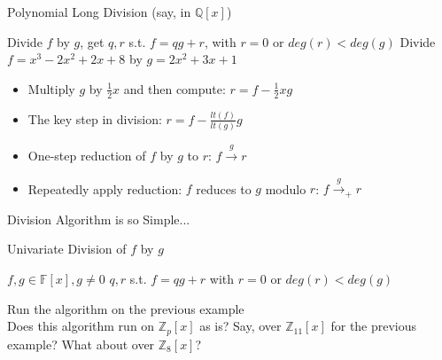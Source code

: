 \documentclass[xcolor=dvipsnames]{beamer}
\newcommand{\Z}{{\mathbb{Z}}}
\newcommand{\Q}{{\mathbb{Q}}}
\newcommand{\F}{{\mathbb{F}}}
\newcommand{\bi}{\begin{itemize}}
\newcommand{\ei}{\end{itemize}}
\begin{document}
\begin{frame}{{\large Polynomial Long Division (say, in $\Q[x]$)}}

Divide $f$ by $g$, get $q, r$ s.t. $f = qg + r$, with $r = 0$ or
$deg(r) < deg(g)$
\pause
Divide $f = x^3-2x^2+2x+8$ by $g =2x^2+3x + 1$\\

\pause


\pause

\bi
\item Multiply $g$ by $\frac{1}{2}x$ and then compute: $r = f - \frac{1}{2}x g$
\item The key step in division: \alert{$r = f - \frac{lt(f)}{lt(g)}
  g$}
\item One-step reduction of $f$ by $g$ to $r$: $f \xrightarrow{g} r$
\item Repeatedly apply reduction: $f$ reduces to $g$ modulo $r$: $f \xrightarrow{g}_+ r$
\ei

\end{frame}

\begin{frame}{{\large Division Algorithm is so Simple...}}

 \begin{algorithm}[H]
 \caption{Univariate Division of $f$ by $g$}
 \label{algo:reduce}
 \begin{algorithmic}[1]

 \REQUIRE $f, g \in \F[x], g\neq 0$
 \ENSURE $q, r$ s.t. $f = qg+r$ with $r =0$ or $deg(r) < deg(g)$
 \ENDWHILE

 \end{algorithmic}
 \end{algorithm}

Run the algorithm on the previous example\\

Does this algorithm run on $\Z_p[x]$ as is? Say, over $\Z_{11}[x]$ for
the previous example? What about over $\Z_{8}[x]$? 

\end{frame}
\end{document}
